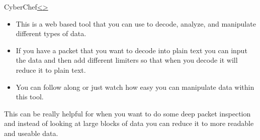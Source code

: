 \documentclass[12pt]{article}
\newcommand{\code}[1]{\texttt{\bfseries#1}}
\newenvironment{instructionblock}{\Large\bgroup}{\egroup}
\newcommand{\bi}{\begin{itemize}}
\newcommand{\ei}{\end{itemize}}
\begin{document}
\pagebreak
\begin{slide}{CyberChef}{\hyperref[slide 11]{\textless}\hyperref[slide 13]{\textgreater}}
	\begin{instructionblock}
            \bi
			\item This is a web based tool that you can use to decode, analyze, and manipulate different types of data.
            \item If you have a packet that you want to decode into plain text you can input the data and then add different limiters so that when you decode it will reduce it to plain text.
            \item You can follow along or just watch how easy you can manipulate data within this tool. 
	        \ei
		
		
		
	\end{instructionblock}
\end{slide}
\vfill
This can be really helpful for when you want to do some deep packet inspection and instead of looking at large blocks of data you can reduce it to more readable and useable data.


\pagebreak
\end{document}
